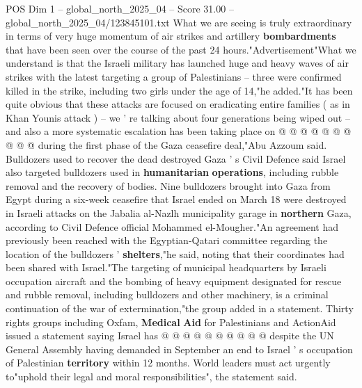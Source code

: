 \begin{textsample}{POS Dim 1 – global\_north\_2025\_04 – Score 31.00 – global\_north\_2025\_04/123845101.txt}
What we are seeing is truly extraordinary in terms of very huge momentum of air strikes and artillery \textbf{bombardments} that have been seen over the course of the past 24 hours."Advertisement"What we understand is that the Israeli military has launched huge and heavy waves of air strikes with the latest targeting a group of Palestinians -- three were confirmed killed in the strike, including two girls under the age of 14,"he added."It has been quite obvious that these attacks are focused on eradicating entire families ( as in Khan Younis attack ) -- we ' re talking about four generations being wiped out -- and also a more systematic escalation has been taking place on @ @ @ @ @ @ @ @ @ @ during the first phase of the Gaza ceasefire deal,"Abu Azzoum said.
Bulldozers used to recover the dead destroyed Gaza ' s Civil Defence said Israel also targeted bulldozers used in \textbf{humanitarian} \textbf{operations}, including rubble removal and the recovery of bodies.
Nine bulldozers brought into Gaza from Egypt during a six-week ceasefire that Israel ended on March 18 were destroyed in Israeli attacks on the Jabalia al-Nazlh municipality garage in \textbf{northern} Gaza, according to Civil Defence official Mohammed el-Mougher."An agreement had previously been reached with the Egyptian-Qatari committee regarding the location of the bulldozers ' \textbf{shelters},"he said, noting that their coordinates had been shared with Israel."The targeting of municipal headquarters by Israeli occupation aircraft and the bombing of heavy equipment designated for rescue and rubble removal, including bulldozers and other machinery, is a criminal continuation of the war of extermination,"the group added in a statement.
Thirty rights groups including Oxfam, \textbf{Medical} \textbf{Aid} for Palestinians and ActionAid issued a statement saying Israel has @ @ @ @ @ @ @ @ @ @ despite the UN General Assembly having demanded in September an end to Israel ' s occupation of Palestinian \textbf{territory} within 12 months.
World leaders must act urgently to"uphold their legal and moral responsibilities", the statement said.

\end{textsample}
